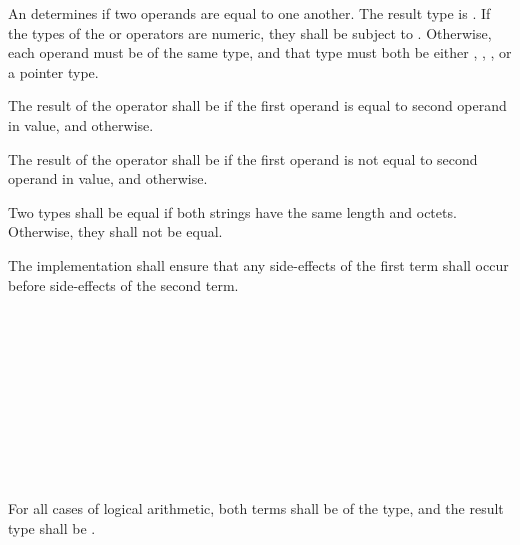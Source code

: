 \specsubsubitem
An  determines if two operands are equal to one
another. The result type is . If the types of the \terminal{==}
or \terminal{!=} operators are numeric, they shall be subject to
. Otherwise, each operand must be of the same type, and
that type must both be either , , ,
or a pointer type.

\specsubsubitem
The result of the \terminal{==} operator shall be  if the first
operand is equal to second operand in value, and  otherwise.

\specsubsubitem
The result of the \terminal{!=} operator shall be  if the first
operand is not equal to second operand in value, and  otherwise.

\specsubsubitem
Two  types shall be equal if both strings have the same length and
octets. Otherwise, they shall not be equal.

\specsubsubitem
The implementation shall ensure that any side-effects of the first term shall
occur before side-effects of the second term.


\begin{grammar}
 \\
	 \\
	 \terminal{\&\&}  \\

 \\
	 \\
	 \terminal{\textasciicircum\textasciicircum}  \\

 \\
	 \\
	 \terminal{||}  \\
\end{grammar}

\specsubsubitem
For all cases of logical arithmetic, both terms shall be of the 
type, and the result type shall be .


